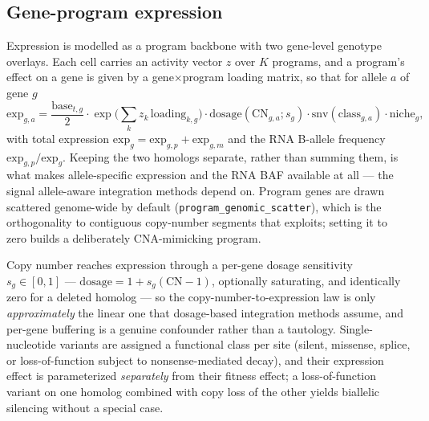 \documentclass{article}
\begin{document}
\subsection{Gene-program expression}
\label{sec:methods_expression}
Expression is modelled as a program backbone with two gene-level genotype overlays. Each cell carries
an activity vector $z$ over $K$ programs, and a program's effect on a gene is given by a
gene$\times$program loading matrix, so that for allele $a$ of gene $g$
\begin{equation*}
\mathrm{exp}_{g,a} = \frac{\mathrm{base}_{t,g}}{2}\cdot
  \exp\!\Big(\textstyle\sum_k z_k\,\mathrm{loading}_{k,g}\Big)\cdot
  \mathrm{dosage}(\mathrm{CN}_{g,a};s_g)\cdot \mathrm{snv}(\mathrm{class}_{g,a})\cdot \mathrm{niche}_g ,
\end{equation*}
with total expression $\mathrm{exp}_g=\mathrm{exp}_{g,p}+\mathrm{exp}_{g,m}$ and the RNA B-allele
frequency $\mathrm{exp}_{g,p}/\mathrm{exp}_g$. Keeping the two homologs separate, rather than summing
them, is what makes allele-specific expression and the RNA BAF available at all --- the signal
allele-aware integration methods depend on. Program genes are drawn scattered genome-wide by default
(\texttt{program\_genomic\_scatter}), which is the orthogonality to contiguous copy-number segments
that  exploits; setting it to zero builds a deliberately CNA-mimicking program.

Copy number reaches expression through a per-gene dosage sensitivity $s_g\in[0,1]$ ---
$\mathrm{dosage}=1+s_g(\mathrm{CN}-1)$, optionally saturating, and identically zero for a deleted
homolog --- so the copy-number-to-expression law is only \emph{approximately} the linear one that
dosage-based integration methods assume, and per-gene buffering is a genuine confounder rather than a
tautology. Single-nucleotide variants are assigned a functional class per site (silent, missense,
splice, or loss-of-function subject to nonsense-mediated decay), and their expression effect is
parameterized \emph{separately} from their fitness effect; a loss-of-function variant on one homolog
combined with copy loss of the other yields biallelic silencing without a special case.
\end{document}
